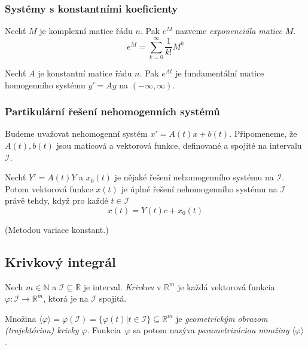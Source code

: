 \pagebreak

\subsubsection{Systémy s konstantními koeficienty}

\begin{definition}
    Nechť $M$ je komplexní matice řádu $n$. Pak $e^M$ nazveme
    {\em exponenciála matice} $M$.
\[
    e^M = \sum_{k = 0}^{\infty} \frac{1}{k!} M^k
\]
\end{definition}

\begin{theorem}
    Nechť $A$ je konstantní matice řádu $n$.
    Pak $e^{At}$ je fundamentální matice homogenního systému $y' = Ay$
    na $(-\infty, \infty)$.
\end{theorem}

\begin{example}
\end{example}

\subsubsection{Partikulární řešení nehomogenních systémů}

Budeme uvažovat nehomogenní systém $x' = A(t)x + b(t)$.
Připomeneme, že $A(t), b(t)$ jsou maticová a vektorová funkce,
definované a spojité na intervalu $\mathcal{I}$.

\begin{theorem}
    Nechť $Y' = A(t)Y$ a $x_0(t)$ je nějaké řešení nehomogenního systému
    na $\mathcal{I}$. Potom vektorová funkce $x(t)$ je úplné řešení
    nehomogenního systému na $\mathcal{I}$ právě tehdy,
    když pro každé $t \in \mathcal{I}$
    \[
        x(t) = Y(t)c + x_0(t)
    \]
\end{theorem}

\begin{example}
    (Metodou variace konstant.)
\end{example}

\subsection{Krivkový integrál}
\begin{definition}[Krivka]
	Nech $m \in \mathbb{N}$ a $\mathcal{I} \subseteq \mathbb{R}$
	je interval.
	{\em Krivkou} v $\mathbb{R}^m$ je každá vektorová
	funkcia $\varphi: \mathcal{I} \to \mathbb{R}^m$, 
	ktorá je na $\mathcal{I}$ spojitá.
	
	Množina $\langle \varphi \rangle = \varphi(\mathcal{I})=
	\{ \varphi(t) | t \in \mathcal{I} \} \subseteq \mathbb{R}^m$
	je {\em geometrickým obrazom (trajektóriou) krivky} $\varphi$. Funkcia~$\varphi$
	sa potom nazýva {\em parametrizáciou množiny} $\langle \varphi \rangle$.
\end{definition}

